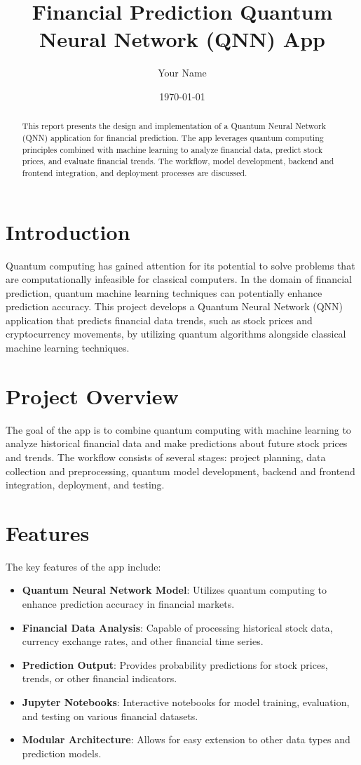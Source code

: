 \documentclass[12pt]{article}
\title{Financial Prediction Quantum Neural Network (QNN) App}
\author{Your Name}
\date{\today}
\begin{document}
\maketitle

\begin{abstract}
This report presents the design and implementation of a Quantum Neural Network (QNN) application for financial prediction. The app leverages quantum computing principles combined with machine learning to analyze financial data, predict stock prices, and evaluate financial trends. The workflow, model development, backend and frontend integration, and deployment processes are discussed.
\end{abstract}

\begin{multicols}{2}

\section{Introduction}
Quantum computing has gained attention for its potential to solve problems that are computationally infeasible for classical computers. In the domain of financial prediction, quantum machine learning techniques can potentially enhance prediction accuracy. This project develops a Quantum Neural Network (QNN) application that predicts financial data trends, such as stock prices and cryptocurrency movements, by utilizing quantum algorithms alongside classical machine learning techniques.

\section{Project Overview}
The goal of the app is to combine quantum computing with machine learning to analyze historical financial data and make predictions about future stock prices and trends. The workflow consists of several stages: project planning, data collection and preprocessing, quantum model development, backend and frontend integration, deployment, and testing.

\section{Features}
The key features of the app include:
\begin{itemize}
    \item \textbf{Quantum Neural Network Model}: Utilizes quantum computing to enhance prediction accuracy in financial markets.
    \item \textbf{Financial Data Analysis}: Capable of processing historical stock data, currency exchange rates, and other financial time series.
    \item \textbf{Prediction Output}: Provides probability predictions for stock prices, trends, or other financial indicators.
    \item \textbf{Jupyter Notebooks}: Interactive notebooks for model training, evaluation, and testing on various financial datasets.
    \item \textbf{Modular Architecture}: Allows for easy extension to other data types and prediction models.
\end{itemize}


\end{multicols}
\end{document}

